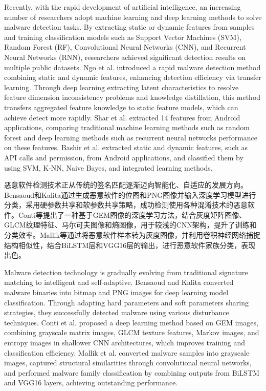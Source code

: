 Recently, with the rapid development of artificial intelligence, an increasing number of researchers adopt machine learning and deep learning methods to solve malware detection tasks. By extracting static or dynamic features from samples and training classification models such as Support Vector Machines (SVM), Random Forest (RF), Convolutional Neural Networks (CNN), and Recurrent Neural Networks (RNN), researchers achieved significant detection results on multiple public datasets. Ngo et al. introduced a rapid malware detection method combining static and dynamic features, enhancing detection efficiency via transfer learning\cite{ngo2023fast}. Through deep learning extracting latent characteristics to resolve feature dimension inconsistency problems and knowledge distillation, this method transfers aggregated feature knowledge to static feature models, which can achieve detect more rapidly. Shar et al. extracted 14 features from Android applications, comparing traditional machine learning methods such as random forest and deep learning methods such as recurrent neural networks performance on these features\cite{shar2023experimental}. Bashir et al. extracted static and dynamic features, such as API calls and permission, from Android applications, and classified them by using SVM, K-NN, Naive Bayes, and integrated learning methods\cite{bashir2024hybrid}.

恶意软件检测技术正从传统的签名匹配逐渐迈向智能化、自适应的发展方向。Bensaoud和Kalita\cite{bensaoud2022deep}通过生成恶意软件的位图和PNG图像并输入深度学习模型进行分类，采用硬参数共享和软参数共享策略，成功检测使用各种混淆技术的恶意软件。Conti等\cite{conti2022few}提出了一种基于GEM图像的深度学习方法，结合灰度矩阵图像、GLCM纹理特征、马尔可夫图像和熵图像，用于较浅的CNN架构，提升了训练和分类效率。Mallik等\cite{mallik2022conrec}通过将恶意软件样本转为灰度图像，并利用卷积神经网络捕捉结构相似性，结合BiLSTM层和VGG16层的输出，进行恶意软件家族分类，表现出色。

Malware detection technology is gradually evolving from traditional signature matching to intelligent and self-adaptive. Bensaoud and Kalita converted malware binaries into bitmap and PNG images for deep learning model classification\cite{bensaoud2022deep}. Through adapting hard parameters and soft parameters sharing strategies, they successfully detected malware using various disturbance techniques. Conti et al. proposed a deep learning method based on GEM images\cite{conti2022few}, combining grayscale matrix images, GLCM texture features, Markov images, and entropy images in shallower CNN architectures, which improves training and classification efficiency. Mallik et al. converted malware samples into grayscale images\cite{mallik2022conrec}, captured structural similarities through convolutional neural networks, and performed malware family classification by combining outputs from BiLSTM and VGG16 layers, achieving outstanding performance.

